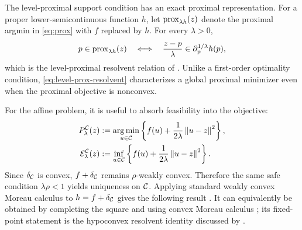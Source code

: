 The level-proximal support condition has an exact proximal representation.
For a proper lower-semicontinuous function \(h\), let
\(\operatorname{prox}_{\lambda h}(z)\) denote the proximal argmin in
\cref{eq:prox} with \(f\) replaced by \(h\).  For every \(\lambda>0\),
\begin{equation}
  p\in\operatorname{prox}_{\lambda h}(z)
  \quad\Longleftrightarrow\quad
  \frac{z-p}{\lambda}
  \in\partial_{\mathrm p}^{1/\lambda}h(p),
  \label{eq:level-prox-resolvent}
\end{equation}
which is the level-proximal resolvent relation of
\citet[Proposition~3.4(ii)]{WangWang2024}.  Unlike a
first-order optimality condition, \cref{eq:level-prox-resolvent}
characterizes a global proximal minimizer even when the proximal objective is
nonconvex.

For the affine problem, it is useful to absorb feasibility into the objective:
\begin{align}
  P_\lambda^{\mathcal{C}}(z)
    &:=\operatorname*{arg\,min}_{u\in\mathcal{C}}
       \left\{f(u)+\frac{1}{2\lambda}\left\lVert u-z\right\rVert^2\right\}, \label{eq:cprox}\\
  \mathcal{E}_\lambda^{\mathcal{C}}(z)
    &:=\inf_{u\in\mathcal{C}}
       \left\{f(u)+\frac{1}{2\lambda}\left\lVert u-z\right\rVert^2\right\}. \label{eq:cenvelope}
\end{align}
Since \(\delta_{\mathcal{C}}\) is convex, \(f+\delta_{\mathcal{C}}\) remains
\(\rho\)-weakly convex.  Therefore the same safe condition
\(\lambda\rho<1\) yields uniqueness on \(\mathcal{C}\).  Applying standard weakly
convex Moreau calculus to \(h=f+\delta_{\mathcal{C}}\) gives the following result
\citep[Lemma~2.5]{DavisDrusvyatskiy2022}.  It can equivalently be obtained by
completing the square and using convex Moreau calculus
\citep[Theorem~2.26 and Exercise~12.61]{RockafellarWets1998}; its fixed-point
statement is the hypoconvex resolvent identity discussed by
\citet[Theorems~3.1 and~3.7]{WangWang2024}.


